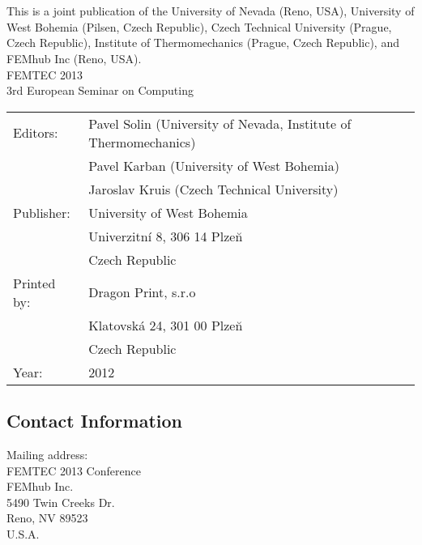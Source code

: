 \documentclass[article,A4,11pt]{llncs}%
\newcommand\BackgroundPic{
\put(0,0){
\parbox[b][\paperheight]{\paperwidth}{%
\vfill
\centering
\vfill
}}}
\begin{document}

\vbox{}
\pagestyle{empty}

\newpage

\textwidth=15.5cm

\ClearShipoutPicture

\newpage

\section*{}%

\vspace*{60mm}
This is a joint publication of the University of Nevada (Reno, USA),
University of West Bohemia (Pilsen, Czech Republic),
Czech Technical University (Prague, Czech Republic),
Institute of Thermomechanics (Prague, Czech Republic), and
FEMhub Inc (Reno, USA).\\

\noindent
FEMTEC 2013 \\
3rd European Seminar on Computing\\

\noindent
\begin{tabular}{ll}
Editors: & Pavel Solin (University of Nevada, Institute of Thermomechanics) \\
 & Pavel Karban (University of West Bohemia) \\
 & Jaroslav Kruis (Czech Technical University) \\
Publisher: & University of West Bohemia \\
 & Univerzitn\'{i} 8, 306 14 Plze\u{n}\\
 & Czech Republic\\
Printed by: & Dragon Print, s.r.o \\
 & Klatovsk\'{a} 24, 301 00 Plze\u{n}\\
 & Czech Republic\\
Year: & 2012\\
\end{tabular}

\subsection*{Contact Information}

Mailing address:\\
FEMTEC 2013 Conference\\
FEMhub Inc.\\
5490 Twin Creeks Dr.\\
Reno, NV 89523\\
U.S.A.
\end{document}
